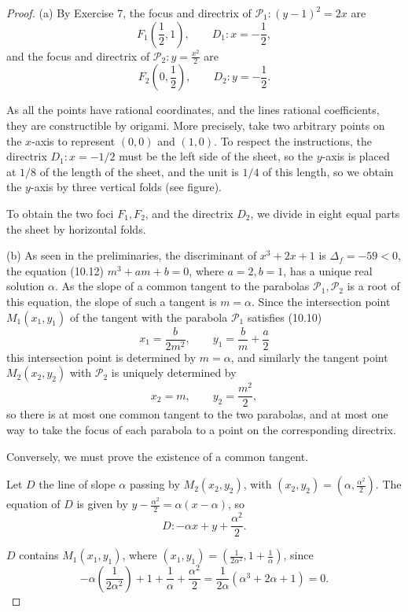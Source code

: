 \documentclass[11pt,a4paper]{article}
\begin{document}
\begin{proof}
\item[(a)] By Exercise 7, the focus and directrix of ${\mathscr P} _1 : (y-1)^2 = 2x$ are $$F_1\left (\frac{1}{2},1\right), \qquad D_1 : x = -\frac{1}{2},$$
and the focus and directrix of ${\mathscr P} _2 : y = \frac{x^2}{2}$ are $$F_2\left(0,\frac{1}{2}\right), \qquad D_2 : y = -\frac{1}{2}.$$

As all the points have rational coordinates, and the lines rational coefficients, they are constructible by origami. More precisely, take two arbitrary points on the $x$-axis to represent $(0,0)$ and $(1,0)$. To respect the instructions, the directrix $D_1 : x = -1/2$ must be the left side of the sheet, so the $y$-axis is placed at $1/8$ of the length of the sheet, and the unit is $1/4$ of this length, so we obtain the $y$-axis by three vertical folds (see figure). 

To obtain the two foci $F_1,F_2$, and the directrix $D_2$, we divide in eight equal parts the sheet by horizontal folds.

\item[(b)] As seen in the preliminaries, the discriminant of $x^3+2x+1$ is $\Delta_f =  -59<0$, the equation (10.12) $m^3+am+b = 0$, where $a = 2,b=1$, has a unique real solution $\alpha$. As the slope of a common tangent to the parabolas ${\mathscr P} _1,{\mathscr P} _2$ is a  root of this equation, the slope of such a tangent is $m=\alpha$. Since the intersection point $M_1(x_1,y_1)$ of the tangent with the parabola ${\mathscr P} _1$ satisfies (10.10)
$$x_1 = \frac{b}{2m^2}, \qquad y_1 = \frac{b}{m} + \frac{a}{2}$$
this intersection point is determined by $m = \alpha$, and similarly the tangent point  $M_2(x_2,y_2)$ with ${\mathscr P} _2$ is uniquely determined by 
$$x_2 = m, \qquad y_2 = \frac{m^2}{2},$$ so there is at most one common tangent to the two parabolas, and at most one way to take the focus of each parabola to a point on the corresponding directrix.

Conversely, we must prove the existence of a common tangent.

Let $D$ the line of slope $\alpha$ passing by $M_2(x_2,y_2)$, with $(x_2,y_2) = (\alpha,\frac{\alpha^2}{2})$. The equation of $D$ is given by $y-\frac{\alpha^2}{2} = \alpha (x-\alpha)$, so
$$D : -\alpha x + y +\frac{\alpha^2}{2}.$$

$D$ contains $M_1(x_1,y_1)$, where $(x_1,y_1) = (\frac{1}{2\alpha^2},1+\frac{1}{\alpha})$, since
$$-\alpha\left (\frac{1}{2\alpha^2}\right) + 1 + \frac{1}{\alpha} + \frac{\alpha^2}{2} = \frac{1}{2\alpha}(\alpha^3+2\alpha+1) = 0.$$


\end{proof}
\end{document}
